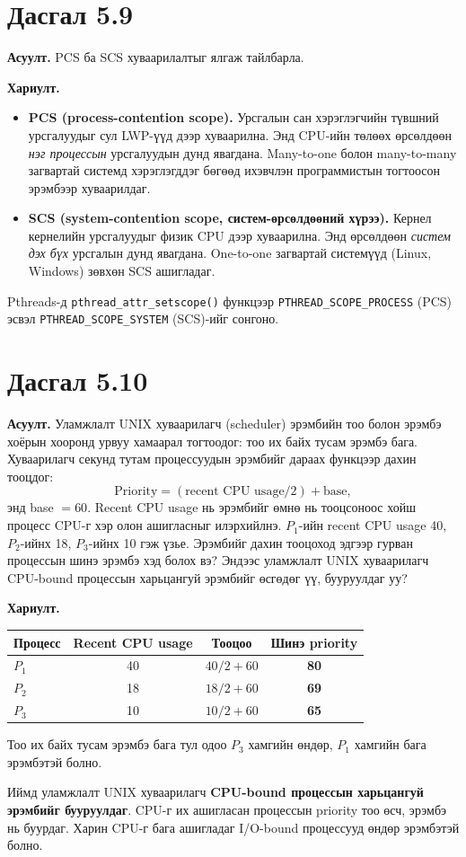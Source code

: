 \documentclass[12pt,a4paper]{article}
\newcommand{\question}[2]{\section{Дасгал #1}\textbf{Асуулт.} #2\par\medskip\textbf{Хариулт.}\par}
\begin{document}
\question{5.9}{PCS ба SCS хуваарилалтыг ялгаж тайлбарла.}

\begin{itemize}[leftmargin=1.5em]
  \item \textbf{PCS (process-contention scope).} Урсгалын сан хэрэглэгчийн түвшний урсгалуудыг сул LWP-үүд дээр хуваарилна. Энд CPU-ийн төлөөх өрсөлдөөн \emph{нэг процессын} урсгалуудын дунд явагдана. Many-to-one болон many-to-many загвартай системд хэрэглэгддэг бөгөөд ихэвчлэн программистын тогтоосон эрэмбээр хуваарилдаг.
  \item \textbf{SCS (system-contention scope, систем-өрсөлдөөний хүрээ).} Кернел кернелийн урсгалуудыг физик CPU дээр хуваарилна. Энд өрсөлдөөн \emph{систем дэх бүх} урсгалын дунд явагдана. One-to-one загвартай системүүд (Linux, Windows) зөвхөн SCS ашигладаг.
\end{itemize}
Pthreads-д \texttt{pthread\_attr\_setscope()} функцээр \texttt{PTHREAD\_SCOPE\_PROCESS} (PCS) эсвэл \texttt{PTHREAD\_SCOPE\_SYSTEM} (SCS)-ийг сонгоно.

\question{5.10}{Уламжлалт UNIX хуваарилагч (scheduler) эрэмбийн тоо болон эрэмбэ хоёрын хооронд урвуу хамаарал тогтоодог: тоо их байх тусам эрэмбэ бага. Хуваарилагч секунд тутам процессуудын эрэмбийг дараах функцээр дахин тооцдог:
\[\text{Priority} = (\text{recent CPU usage} / 2) + \text{base},\]
энд base $= 60$. Recent CPU usage нь эрэмбийг өмнө нь тооцсоноос хойш процесс CPU-г хэр олон ашигласныг илэрхийлнэ. $P_1$-ийн recent CPU usage 40, $P_2$-ийнх 18, $P_3$-ийнх 10 гэж үзье. Эрэмбийг дахин тооцоход эдгээр гурван процессын шинэ эрэмбэ хэд болох вэ? Эндээс уламжлалт UNIX хуваарилагч CPU-bound процессын харьцангуй эрэмбийг өсгөдөг үү, бууруулдаг уу?}

\begin{center}
\begin{tabular}{lccc}\toprule
Процесс & Recent CPU usage & Тооцоо & Шинэ priority\\\midrule
$P_1$ & 40 & $40/2 + 60$ & \textbf{80}\\
$P_2$ & 18 & $18/2 + 60$ & \textbf{69}\\
$P_3$ & 10 & $10/2 + 60$ & \textbf{65}\\\bottomrule
\end{tabular}
\end{center}

Тоо их байх тусам эрэмбэ бага тул одоо $P_3$ хамгийн өндөр, $P_1$ хамгийн бага эрэмбэтэй болно.

Иймд уламжлалт UNIX хуваарилагч \textbf{CPU-bound процессын харьцангуй эрэмбийг бууруулдаг}. CPU-г их ашигласан процессын priority тоо өсч, эрэмбэ нь буурдаг. Харин CPU-г бага ашигладаг I/O-bound процессууд өндөр эрэмбэтэй болно.
\end{document}
